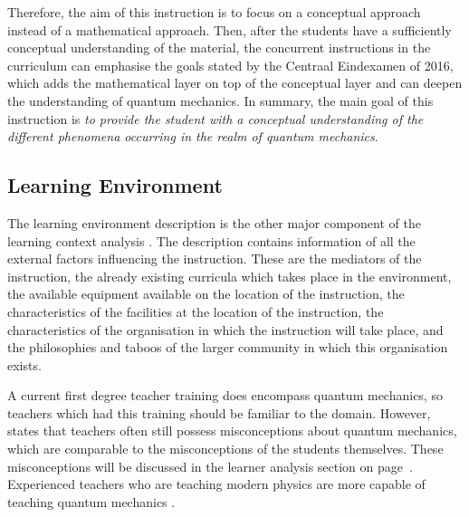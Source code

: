 \documentclass[11pt,twoside]{report} %
\begin{document}
Therefore, the aim of this instruction is to focus on a conceptual approach instead of a mathematical approach. Then, after the students have a sufficiently conceptual understanding of the material, the concurrent instructions in the curriculum can emphasise the goals stated by the Centraal Eindexamen of 2016, which adds the mathematical layer on top of the conceptual layer and can deepen the understanding of quantum mechanics. In summary, the main goal of this instruction is \emph{to provide the student with a conceptual understanding of the different phenomena occurring in the realm of quantum mechanics}.


\subsection{Learning Environment}

The learning environment description is the other major component of the learning context analysis \cite{smithragan}. The description contains information of all the external factors influencing the instruction. These are the mediators of the instruction, the already existing curricula which takes place in the environment, the available equipment available on the location of the instruction, the characteristics of the facilities at the location of the instruction, the characteristics of the organisation in which the instruction will take place, and the philosophies and taboos of the larger community in which this organisation exists.

A current first degree teacher training \cite{leraarnatuurkundemaster} does encompass quantum mechanics, so teachers which had this training should be familiar to the domain. However,  states that teachers often still possess misconceptions about quantum mechanics, which are comparable to the misconceptions of the students themselves. These misconceptions will be discussed in the learner analysis section on page~\pageref{sec:learneranalysis}. Experienced teachers who are teaching modern physics are more capable of teaching quantum mechanics \cite{asikainen}.
\end{document}
